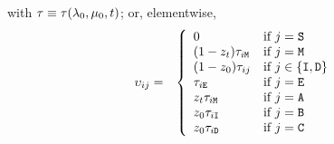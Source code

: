with $\tau \equiv \tau(\lambda_0,\mu_0,t)$;
or, elementwise,
\begin{eqnarray}
    \upsilon_{ij} & = & \left\{
    \begin{array}{ll}
      0 & \mbox{if $j = {\tt S}$} \\
      (1 - z_t) \tau_{i{\tt M}} & \mbox{if $j = {\tt M}$} \\
      (1 - z_0) \tau_{ij} & \mbox{if $j \in \{ {\tt I}, {\tt D} \}$} \\
      \tau_{i{\tt E}} & \mbox{if $j={\tt E}$} \\
      z_t \tau_{i{\tt M}} & \mbox{if $j = {\tt A}$} \\
      z_0 \tau_{i{\tt I}} & \mbox{if $j = {\tt B}$} \\
      z_0 \tau_{i{\tt D}} & \mbox{if $j = {\tt C}$}
    \end{array}
    \right. \label{eq:exptrans_elementwise}
\end{eqnarray}

